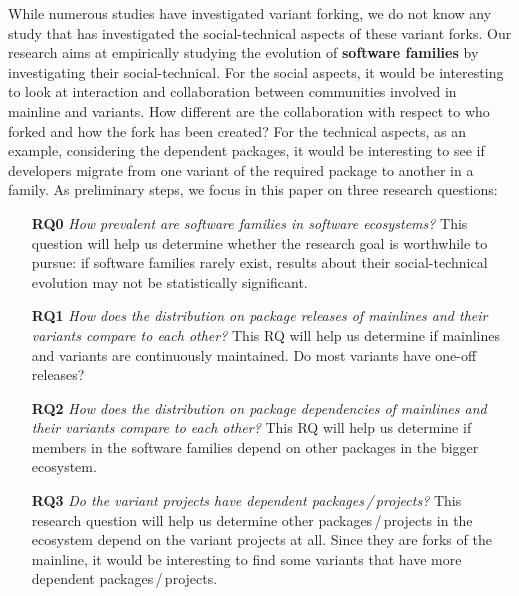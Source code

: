 While numerous studies have investigated variant forking, we do not know any study that has investigated the social-technical aspects of these variant forks. 
Our research aims at empirically studying the evolution of \textbf{software families} by investigating their social-technical. 
For the social aspects, it would be interesting to look at interaction and collaboration between communities involved in mainline and variants.
How different are the collaboration with respect to who forked and how the fork has been created?
For the technical aspects, as an example, considering the dependent packages, it would be interesting to see if developers migrate from one variant of the required package to another in a family.
As preliminary steps, we focus in this paper on three research questions:
\begin{itemize}
\item[\textbf{RQ0}] \textit{How prevalent are software families in software ecosystems?} 
This question will help us determine whether the research goal is worthwhile to pursue: if software families rarely exist, results about their social-technical evolution may not be statistically significant.  

\item[\textbf{RQ1}] \textit{How does the distribution on package releases of mainlines and their variants compare to each other? }
This RQ will help us determine if mainlines and variants are continuously maintained. 
Do most variants have one-off releases?

\item[\textbf{RQ2}] \textit{How does the distribution on package dependencies of mainlines and their variants compare to each other?}
This RQ will help us determine if members in the software families depend on other packages in the bigger \js ecosystem.

\item[\textbf{RQ3}] \textit{Do the variant projects have dependent packages\,/\,projects?}
This research question will help us determine other packages\,/\,projects in the ecosystem depend on the variant projects at all.
Since they are forks of the mainline, it would be interesting to find some variants that have more dependent packages\,/\,projects.
\end{itemize}

